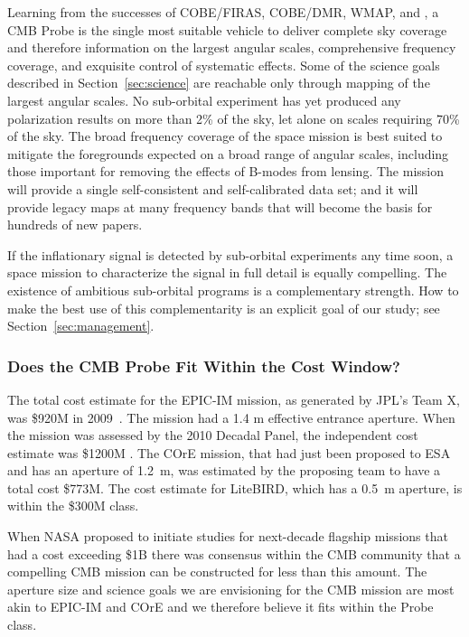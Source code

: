Learning from the successes of COBE/FIRAS, COBE/DMR, WMAP, and \planck, a
CMB Probe is the single most suitable vehicle to deliver complete sky coverage 
and therefore information on the largest angular scales, 
comprehensive frequency coverage, and exquisite control of systematic effects. 
Some of the science goals described in Section~\ref{sec:science} 
are reachable only through mapping of the largest angular scales. No sub-orbital experiment 
has yet produced any polarization results on more than 2\% of the sky, let alone 
on scales requiring 70\% of the sky. The broad frequency coverage of the space 
mission is best suited to mitigate the foregrounds expected on a broad range of angular 
scales, including those important for removing the effects of B-modes from lensing. 
The mission will provide a single self-consistent and self-calibrated data set;  and it  
will provide legacy maps at many frequency bands that will become the basis for 
hundreds of new papers. 

If the inflationary signal is detected by sub-orbital experiments
any time soon, a space mission to characterize the signal in full detail is equally compelling. 
The existence of ambitious sub-orbital programs is a complementary strength. How 
to make the best use of this complementarity is an explicit goal of our study; 
see Section~\ref{sec:management}.

\vspace{-0.18in}

\subsubsection{Does the CMB Probe Fit Within the Cost Window?} 

\vspace{-0.05in}

The total cost estimate for the EPIC-IM mission, as generated by JPL's Team X, was \$920M in 2009~\cite{}. 
The mission had a 1.4 m effective entrance aperture. When the mission was assessed
by the 2010 Decadal Panel, the independent cost estimate was \$1200M . The COrE mission, that had just been 
proposed to ESA and has an aperture of 1.2~m, was estimated by the proposing team to have a total cost \$773M. The cost
estimate for LiteBIRD, which has a 0.5~m aperture, is within the \$300M class. 

When NASA proposed to initiate studies for next-decade flagship missions that had a cost exceeding \$1B
there was consensus within the CMB community that a compelling CMB mission can be constructed for 
less than this amount.  The aperture size and science goals we are envisioning for the CMB mission 
are most akin to EPIC-IM and COrE and we therefore believe it fits within the Probe class. 

